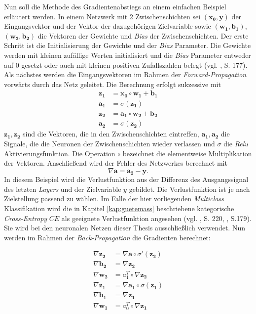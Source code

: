 \documentclass[a4paper,11pt]{article}
\begin{document}
Nun soll die Methode des Gradientenabstiegs an einem einfachen Beispiel erläutert werden. In einem Netzwerk mit 2 Zwischenschichten sei $(\bm{x_0}, \bm{y})$ der Eingangsvektor und der Vektor der dazugehörigen Zielvariable sowie $(\bm{w_1}, \bm{b_1})$, $(\bm{w_2}, \bm{b_2})$ die Vektoren der Gewichte und \textit{Bias} der Zwischenschichten. Der erste Schritt ist die Initialisierung der Gewichte und der \textit{Bias} Parameter. Die Gewichte werden mit kleinen zufällige Werten initialisiert und die \textit{Bias} Parameter entweder auf $0$ gesetzt oder auch mit kleinen positiven Zufallszahlen belegt (vgl. \cite{deepL}, S. 177). Als nächstes werden die Eingangsvektoren im Rahmen der \textit{Forward-Propagation} vorwärts durch das Netz geleitet. Die Berechnung erfolgt sukzessive mit
\begin{align*}
    \bm{z_1} &= \bm{x_0} \circ \bm{w_1} + \bm{b_1} \\
    \bm{a_1} &= \sigma(\bm{z_1}) \\
    \bm{z_2} &= \bm{a_1} \circ \bm{w_2} + \bm{b_2} \\
    \bm{a_2} &= \sigma (\bm{z_2})
\end{align*}{}
$\bm{z_1}, \bm{z_2}$ sind die Vektoren, die in den Zwischenschichten eintreffen, $\bm{a_1}, \bm{a_2}$ die Signale, die die Neuronen der Zwischenschichten wieder verlassen und $\sigma$ die \textit{Relu} Aktivierungsfunktion. Die Operation $\circ$ bezeichnet die elementweise Multiplikation der Vektoren. Anschließend wird der Fehler des Netzwerkes berechnet mit 
\[\nabla \bm{a} = \bm{a_2} - \bm{y} .\]
In diesem Beispiel wird die Verlustfunktion aus der Differenz des Ausgangssignal des letzten \textit{Layers} und der Zielvariable $y$ gebildet. Die Verlustfunktion ist je nach Zielstellung passend zu wählen. Im Falle der hier vorliegenden \textit{Multiclass} Klassifikation wird die in Kapitel \ref{kap:guetemass} beschriebene kategorische \textit{Cross-Entropy} $CE$ als geeignete Verlustfunktion angesehen (vgl. \cite{deepEssentials}, S. 220, \cite{keras}, S.179). Sie wird bei den neuronalen Netzen dieser Thesis ausschließlich verwendet. 
Nun werden im Rahmen der \textit{Back-Propagation} die Gradienten berechnet:

\begin{align*}
    \nabla \bm{z_2} &= \nabla \bm{a} \circ \sigma' (\bm{z_2}) \\
    \nabla \bm{b_2} &= \nabla \bm{z_2} \\
    \nabla \bm{w_2} &= a_1^T \circ \nabla \bm{z_2} \\
    \nabla \bm{z_1} &= \nabla \bm{a_1} \circ \sigma (\bm{z_1}) \\
    \nabla \bm{b_1} &= \nabla \bm{z_1} \\
    \nabla \bm{w_1} &= a_0^T \circ \nabla \bm{z_1} 
\end{align*}{}
\end{document}

